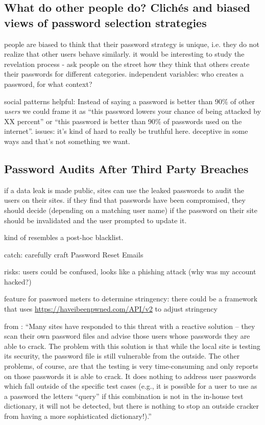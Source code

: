 \subsection{What do other people do? Clichés and biased views of password selection strategies}
people are biased to think that their password strategy is unique, i.e. they do not realize that other users behave similarly. it would be interesting to study the revelation process - ask people on the street how they think that others create their passwords for different categories. independent variables: who creates a password, for what context?

social patterns helpful: Instead of saying a password is better than 90\% of other \textit{users} we could frame it as ``this password lowers your chance of being attacked by XX percent'' or ``this password is better than 90\% of passwords used on the internet''. issues: it's kind of hard to really be truthful here. deceptive in some ways and that's not something we want. 

\subsection{Password Audits After Third Party Breaches}

if a data leak is made public, sites can use the leaked passwords to audit the users on their sites. if they find that passwords have been compromised, they should decide (depending on a matching user name) if the password on their site should be invalidated and the user prompted to update it.

kind of resembles a post-hoc blacklist.  

catch: carefully craft Password Reset Emails \cite{Kim2017TooBusy}

risks: users could be confused, looks like a phishing attack (why was my account hacked?)

feature for password meters to determine stringency: 
there could be a framework that uses \url{https://haveibeenpwned.com/API/v2} to adjust stringency 

from \cite{Bishop1995ProactivePasswordChecking}: ``Many sites have responded to this threat with a reactive solution -- they scan their own password files and advise those users whose passwords they are able to crack. The problem with this solution is that while the local site is testing its security, the password file is still vulnerable from the outside. The other problems, of course, are that the testing is very time-consuming and only reports on those passwords it is able to crack. It does nothing to address user passwords which fall outside of the specific test cases (e.g., it is possible for a user to use as a password the letters ``query'' if this combination is not in the in-house test dictionary, it will not be detected, but there is nothing to stop an outside cracker from having a more sophisticated dictionary!).''

